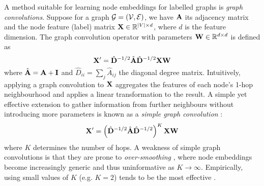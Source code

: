 A method suitable for learning node embeddings for labelled graphs is \emph{graph convolutions}. Suppose for a graph $\mathcal{G} = (\mathcal{V}, \mathcal{E})$, we have $\mathbf{A}$ its adjacency matrix and the node feature (label) matrix $\mathbf{X} \in \mathbb{R}^{|V| \times d}$, where $d$ is the feature dimension. The graph convolution operator with parameters $\mathbf{W} \in \mathbb{R}^{d \times d}$ is defined as
\[
    \mathbf{X}' = \hat{\mathbf{D}}^{-1/2} \hat{\mathbf{A}} \hat{\mathbf{D}}^{-1/2} \mathbf{X} \mathbf{W}
\]
where $\hat{\mathbf{A}} = \mathbf{A} + \mathbf{I}$ and $\hat{D}_{ii} = \sum_j \hat{A}_{ij}$ the diagonal degree matrix. Intuitively, applying a graph convolution to $\mathbf{X}$ aggregates the features of each node's 1-hop neighbourhood and applies a linear transformation to the result. A simple yet effective extension to gather information from further neighbours without introducing more parameters is known as a \emph{simple graph convolution} \cite{wu2019simplifying}:
\begin{equation}  \label{eq:simple-graph-conv}
    \mathbf{X}' = \left(\hat{\mathbf{D}}^{-1/2} \hat{\mathbf{A}} \hat{\mathbf{D}}^{-1/2}\right)^K \mathbf{X} \mathbf{W}
\end{equation}
where $K$ determines the number of hops. A weakness of simple graph convolutions is that they are prone to \emph{over-smoothing} \cite{zhu2020simple}, where node embeddings become increasingly generic and thus uninformative as $K \to \infty$. Empirically, using small values of $K$ (e.g. $K = 2$) tends to be the most effective \cite{wu2019simplifying}.